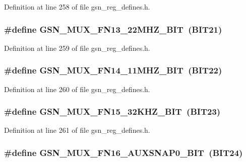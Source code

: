 Definition at line 258 of file gsn\_\-reg\_\-defines.h.

\hypertarget{a00546_a513d38eb9a7a5ef154edbbb97d9398ee}{
\subsubsection[{GSN\_\-MUX\_\-FN13\_\-22MHZ\_\-BIT}]{\setlength{\rightskip}{0pt plus 5cm}\#define GSN\_\-MUX\_\-FN13\_\-22MHZ\_\-BIT~(BIT21)}}
\label{a00546_a513d38eb9a7a5ef154edbbb97d9398ee}


Definition at line 259 of file gsn\_\-reg\_\-defines.h.

\hypertarget{a00546_a6438c22023e9b21cba0a836855490c94}{
\subsubsection[{GSN\_\-MUX\_\-FN14\_\-11MHZ\_\-BIT}]{\setlength{\rightskip}{0pt plus 5cm}\#define GSN\_\-MUX\_\-FN14\_\-11MHZ\_\-BIT~(BIT22)}}
\label{a00546_a6438c22023e9b21cba0a836855490c94}


Definition at line 260 of file gsn\_\-reg\_\-defines.h.

\hypertarget{a00546_ae8c413f0275f99cd2f10a5f2cad79733}{
\subsubsection[{GSN\_\-MUX\_\-FN15\_\-32KHZ\_\-BIT}]{\setlength{\rightskip}{0pt plus 5cm}\#define GSN\_\-MUX\_\-FN15\_\-32KHZ\_\-BIT~(BIT23)}}
\label{a00546_ae8c413f0275f99cd2f10a5f2cad79733}


Definition at line 261 of file gsn\_\-reg\_\-defines.h.

\hypertarget{a00546_a1d2009d2eeb7cae20d0bcab8c9cae922}{
\subsubsection[{GSN\_\-MUX\_\-FN16\_\-AUXSNAP0\_\-BIT}]{\setlength{\rightskip}{0pt plus 5cm}\#define GSN\_\-MUX\_\-FN16\_\-AUXSNAP0\_\-BIT~(BIT24)}}
\label{a00546_a1d2009d2eeb7cae20d0bcab8c9cae922}


